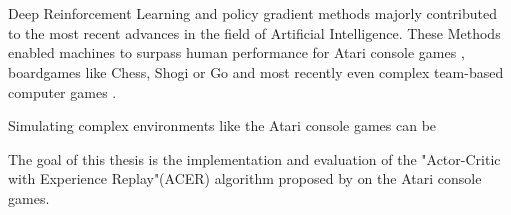 \section*{}
Deep Reinforcement Learning and policy gradient methods majorly contributed to the most recent advances in the field of Artificial Intelligence.
These Methods enabled machines to surpass human performance for Atari console games \citep{mnih2015atari}, boardgames like Chess, Shogi \citep{Shogi17} or Go \citep{Go2017} and most recently even complex team-based computer games \citep{OpenAI_dota}.

Simulating complex environments like the Atari console games can be 

The goal of this thesis is the implementation and evaluation of the "Actor-Critic with Experience Replay"(ACER) algorithm proposed by \cite{ACER} on the Atari console games.